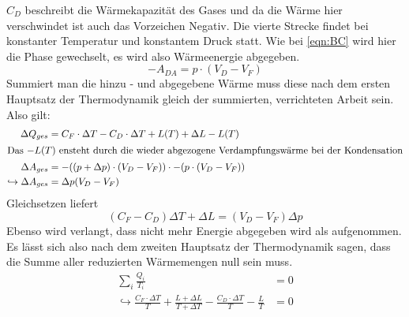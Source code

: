 $C_D$ beschreibt die Wärmekapazität des Gases und da die Wärme hier verschwindet ist auch das Vorzeichen Negativ.
Die vierte Strecke findet bei konstanter Temperatur und konstantem Druck statt. Wie bei \eqref{eqn:BC} wird hier die Phase gewechselt, es wird also Wärmeenergie 
abgegeben.
\begin{equation}
    -A_{DA} = p \cdot (V_D - V_F)
\end{equation}
Summiert man die hinzu - und abgegebene Wärme muss diese nach dem ersten Hauptsatz der Thermodynamik gleich der summierten, verrichteten Arbeit sein.
Also gilt:
\begin{align*}
     \Delta Q_{ges} &= C_F \cdot \Delta T - C_D \cdot \Delta T + L(T) + \Delta L - L(T) \\
     \intertext{Das $-L(T)$ ensteht durch die wieder abgezogene Verdampfungswärme bei der Kondensation}
    \Delta A_{ges} &= -((p+ \Delta p) \cdot (V_D-V_F)) \cdot -(p \cdot (V_D - V_F)) \\
    \hookrightarrow \Delta A_{ges} &= \Delta p (V_D - V_F) 
\end{align*}
Gleichsetzen liefert 
\begin{equation}
    (C_F-C_D)\Delta T + \Delta L = (V_D - V_F) \Delta p
\end{equation}
Ebenso wird verlangt, dass nicht mehr Energie abgegeben wird als aufgenommen. Es lässt sich also nach dem zweiten Hauptsatz der Thermodynamik
sagen, dass die Summe aller reduzierten Wärmemengen null sein muss.
\begin{align*}
    \sum_i \frac{Q_i}{T_i} &= 0 \\
    \hookrightarrow \frac{C_F \cdot\Delta T}{T} + \frac{L + \Delta L}{T+ \Delta T}-\frac{C_D \cdot \Delta T}{T}-\frac{L}{T} &= 0
\end{align*}